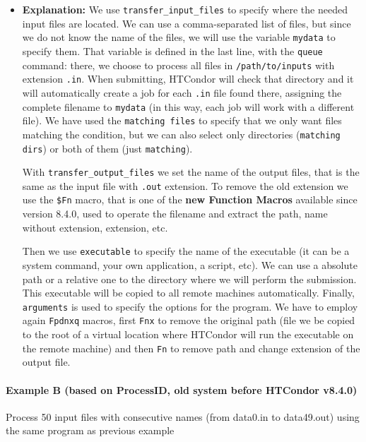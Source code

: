 \documentclass[a4paper,10pt]{article}
\begin{document}
\begin{itemize}
\item \textbf{Explanation:} 
We use \texttt{transfer\_input\_files} to specify where the needed input files are
located. We can use a comma-separated list of files, but since we do not know
the name of the files, we will use the variable \texttt{mydata} to specify them. That
variable is defined in the last line, with the \texttt{queue} command: there, we choose
to process all files in \texttt{/path/to/inputs} with extension \texttt{.in}. When submitting,
HTCondor will check that directory and it will automatically create a job for
each \texttt{.in} file found there, assigning the complete filename to \texttt{mydata} (in
this way, each job will work with a different file). We have used the \texttt{matching
  files} to specify that we only want files matching the condition, but we can
also select only directories (\texttt{matching dirs}) or both of them (just
\texttt{matching}).

With \texttt{transfer\_output\_files} we set the name of the output files, that is the
same as the input file with \texttt{.out} extension. To remove the old extension we use
the \texttt{\$Fn} macro, that is one of the \textbf{new Function Macros}
available since version 8.4.0, used to operate the filename and extract the
path, name without extension, extension, etc.

Then we use \texttt{executable} to specify the name of the executable (it can be a
system command, your own application, a script, etc). We can use a absolute path
or a relative one to the directory where we will perform the submission. This
executable will be copied to all remote machines automatically. Finally,
\texttt{arguments} is used to specify the options for the program. We have to employ
again \texttt{Fpdnxq} macros, first \texttt{Fnx} to remove the original path (file we be
copied to the root of a virtual location where HTCondor will run the executable
on the remote machine) and then \texttt{Fn} to remove path and change extension of the
output file.
\end{itemize}


\paragraph{\textbf{Example B} (based on ProcessID, old system before HTCondor v8.4.0)}
\label{sec:org3d8d020}

Process 50 input files with consecutive names (from data0.in to data49.out)
using the same program as previous example
\end{document}
